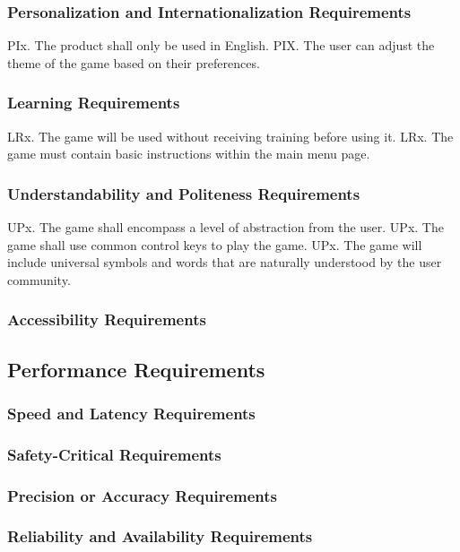 \documentclass{article}
\begin{document}
    \subsubsection{Personalization and Internationalization Requirements}
    PIx. The product shall only be used in English.
    PIX. The user can adjust the theme of the game based on their preferences.
    
    \subsubsection{Learning Requirements}
    LRx. The game will be used without receiving training before using it.
    LRx. The game must contain basic instructions within the main menu page.

    \subsubsection{Understandability and Politeness Requirements}
    UPx. The game shall encompass a level of abstraction from the user.
    UPx. The game shall use common control keys to play the game.
    UPx. The game will include universal symbols and words that are naturally understood by the user community.
    
    \subsubsection{Accessibility Requirements}

\subsection{Performance Requirements}
    \subsubsection{Speed and Latency Requirements}
    \subsubsection{Safety-Critical Requirements}
    \subsubsection{Precision or Accuracy Requirements}
    \subsubsection{Reliability and Availability Requirements}
\end{document}
